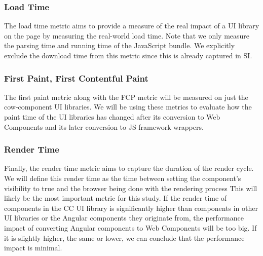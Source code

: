 \subsubsection{Load Time}
The load time metric aims to provide a measure of the real impact of a UI library on the page by measuring the real-world load time. Note that we only measure the parsing time and running time of the JavaScript bundle. We explicitly exclude the download time from this metric since this is already captured in SI\@.

\subsubsection{First Paint, First Contentful Paint}
The first paint metric along with the FCP metric will be measured on just the cow-component UI libraries. We will be using these metrics to evaluate how the paint time of the UI libraries has changed after its conversion to Web Components and its later conversion to JS framework wrappers.

\subsubsection{Render Time}
Finally, the render time metric aims to capture the duration of the render cycle. We will define this render time as the time between setting the component's visibility to true and the browser being done with the rendering process This will likely be the most important metric for this study. If the render time of components in the CC UI library is significantly higher than components in other UI libraries or the Angular components they originate from, the performance impact of converting Angular components to Web Components will be too big. If it is slightly higher, the same or lower, we can conclude that the performance impact is minimal.

